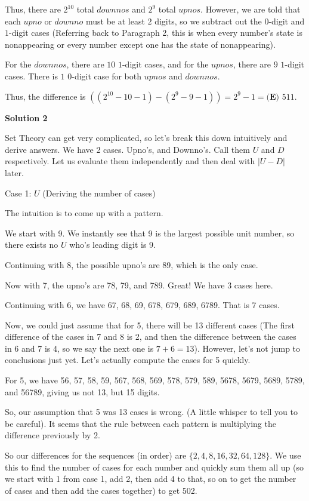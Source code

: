 \begin{enumerate}
 Thus, there are $2^{10}$ total $downnos$ and $2^9$ total $upnos$. However, we are told that each $upno$ or $downno$ must be at least $2$ digits, so we subtract out the $0$-digit and $1$-digit cases (Referring back to Paragraph 2, this is when every number's state is nonappearing or every number except one has the state of nonappearing). 

 For the $downnos$, there are $10$ $1$-digit cases, and for the $upnos$, there are $9$ $1$-digit cases. There is $1$ $0$-digit case for both $upnos$ and $downnos$. 

 Thus, the difference is $\left(\left(2^{10}-10-1\right)-\left(2^9-9-1\right)\right)=2^9-1=\boxed{\textbf{(E) }511}.$




\textbf{Solution 2}

Set Theory can get very complicated, so let's break this down intuitively and derive answers. We have 2 cases. Upno's, and Downno's. Call them \( U \) and \( D \) respectively. Let us evaluate them independently and then deal with \( |U-D| \) later.

 Case 1: \( U \) (Deriving the number of cases)

 The intuition is to come up with a pattern.

 We start with 9. We instantly see that 9 is the largest possible unit number, so there exists no \( U \) who's leading digit is 9.

 Continuing with 8, the possible upno's are 89, which is the only case.

 Now with 7, the upno's are 78, 79, and 789. Great! We have 3 cases here.

 Continuing with 6, we have 67, 68, 69, 678, 679, 689, 6789. That is 7 cases.

 Now, we could just assume that for 5, there will be 13 different cases (The first difference of the cases in 7 and 8 is 2, and then the difference between the cases in 6 and 7 is 4, so we say the next one is \(7+6=13\)). However, let's not jump to conclusions just yet. Let's actually compute the cases for 5 quickly.

 For 5, we have 56, 57, 58, 59, 567, 568, 569, 578, 579, 589, 5678, 5679, 5689, 5789, and 56789, giving us not 13, but 15 digits. 

 So, our assumption that 5 was 13 cases is wrong. (A little whisper to tell you to be careful). It seems that the rule between each pattern is multiplying the difference previously by 2.

 So our differences for the sequences (in order) are \( \{2, 4, 8, 16, 32, 64, 128\} \). We use this to find the number of cases for each number and quickly sum them all up (so we start with 1 from case 1, add 2, then add 4 to that, so on to get the number of cases and then add the cases together) to get 502.


\end{enumerate}
